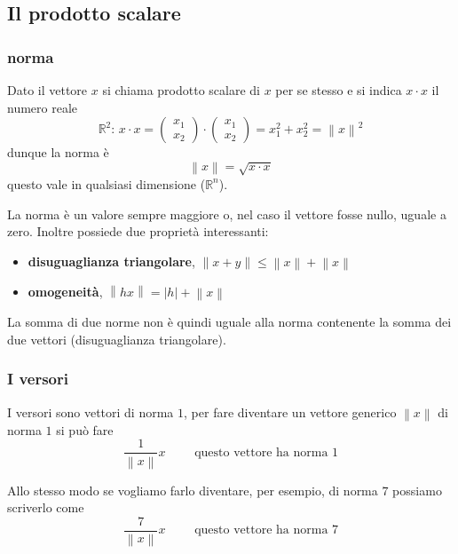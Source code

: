\documentclass[../main.tex]{subfiles}
\begin{document}
\subsection{Il prodotto scalare}
\subsubsection{norma}
Dato il vettore $x$ si chiama prodotto scalare di $x$ per se stesso e si indica $x \cdot x$ il numero reale
$$
   \mathbb{R}^2 \text{: } x \cdot x = \begin{pmatrix} x_1 \\ x_2 \end{pmatrix} \cdot \begin{pmatrix} x_1 \\ x_2 \end{pmatrix} 
   = x^2_1 + x^2_2 = \left\lVert x \right\rVert^2
$$
dunque la norma è
$$
    \left\lVert x \right\rVert = \sqrt{x \cdot x}
$$
questo vale in qualsiasi dimensione ($\mathbb{R}^n$).

\vspace{0.5cm}
La norma è un valore sempre maggiore o, nel caso il vettore fosse nullo, uguale a zero. Inoltre possiede due proprietà interessanti:
\begin{itemize}
    \item \textbf{disuguaglianza triangolare}, $\left\lVert x + y \right\rVert \leq \left\lVert x \right\rVert + \left\lVert x \right\rVert$
    \item \textbf{omogeneità}, $\left\lVert hx \right\rVert = \left\lvert h \right\rvert + \left\lVert x \right\rVert $
\end{itemize}
La somma di due norme non è quindi uguale alla norma contenente la somma dei due vettori (disuguaglianza triangolare).

\vspace{1.5cm}
\subsubsection{I versori}
I versori sono vettori di norma $1$, per fare diventare un vettore generico $\left\lVert x \right\rVert$ di norma $1$ si può fare
$$
    \frac{1}{\left\lVert x \right\rVert } x  \phantom{--}\text{ questo vettore ha norma 1}
$$

Allo stesso modo se vogliamo farlo diventare, per esempio, di norma $7$ possiamo scriverlo come
$$
    \frac{7}{\left\lVert x \right\rVert } x \phantom{--} \text{ questo vettore ha norma 7}
$$
\end{document}
